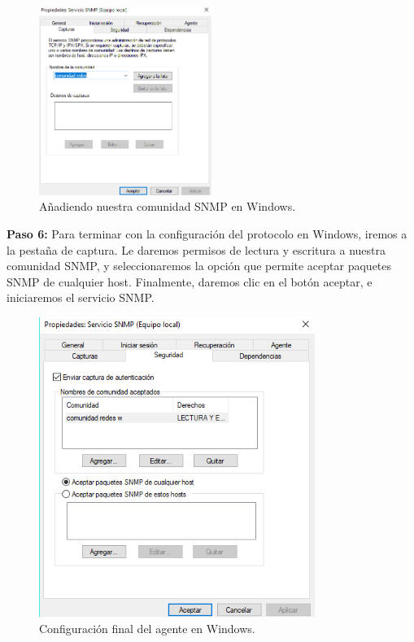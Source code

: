 \begin{figure}[htbp!]
	\centering
		\includegraphics[width=0.5\textwidth]{images/desarrollo/configuracion_windows5.png}
	\caption{Añadiendo nuestra comunidad SNMP en Windows.}
\end{figure} 

\pagebreak
\noindent
\textbf{Paso 6:} Para terminar con la configuración del protocolo en Windows, iremos a la pestaña de captura. Le daremos permisos de lectura y escritura a nuestra comunidad SNMP, y seleccionaremos la opción que permite aceptar paquetes SNMP de cualquier host. Finalmente, daremos clic en el botón aceptar, e iniciaremos el servicio SNMP. 

\begin{figure}[htbp!]
	\centering
		\includegraphics[width=0.8\textwidth]{images/desarrollo/configuracion_windows6.png}
	\caption{Configuración final del agente en Windows.}
\end{figure} 

